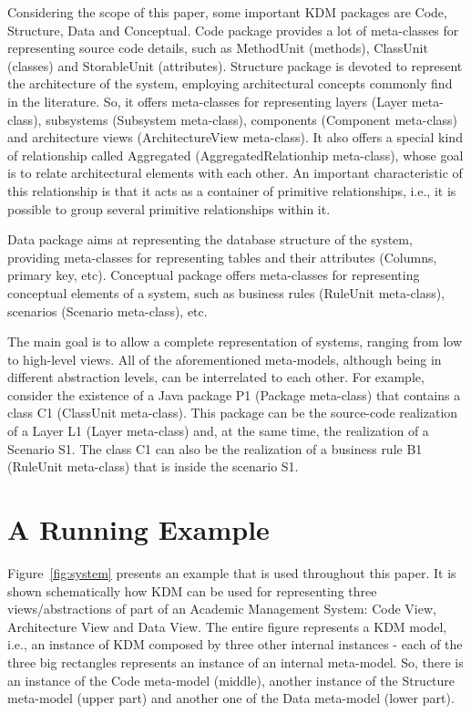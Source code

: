 Considering the scope of this paper, some important KDM packages are Code, Structure, Data and Conceptual. Code package provides a lot of meta-classes for representing source code details, such as MethodUnit (methods), ClassUnit (classes) and StorableUnit (attributes). Structure package is devoted to represent the architecture of the system, employing architectural concepts commonly find in the literature. So, it offers meta-classes for representing layers (Layer meta-class), subsystems (Subsystem meta-class), components (Component meta-class) and architecture views (ArchitectureView meta-class). It also offers a special kind of relationship called Aggregated (AggregatedRelationhip meta-class), whose goal is to relate architectural elements with each other. An important characteristic of this relationship is that it acts as a container of primitive relationships, i.e., it is possible to group several primitive relationships within it. 

Data package aims at representing the database structure of the system, providing meta-classes for representing tables and their attributes (Columns, primary key, etc). Conceptual package offers meta-classes for representing conceptual elements of a system, such as business rules (RuleUnit meta-class), scenarios (Scenario meta-class), etc. 

The main goal is to allow a complete representation of systems, ranging from low to high-level views. All of the aforementioned meta-models, although being in different abstraction levels, can be interrelated to each other. For example, consider the existence of a Java package P1 (Package meta-class) that contains a class C1 (ClassUnit meta-class). This package can be the source-code realization of a Layer L1 (Layer meta-class) and, at the same time, the realization of a Scenario S1. The class C1 can also be the realization of a business rule B1 (RuleUnit meta-class) that is inside the scenario S1. 

\section{A Running Example}\label{sec:running_example}

Figure~\ref{fig:system} presents an example that is used throughout this paper. It is shown schematically how KDM can be used for representing three views/abstractions of part of an Academic Management System: Code View, Architecture View and Data View. The entire figure represents a KDM model, i.e., an instance of KDM composed by three other internal instances - each of the three big rectangles represents an instance of an internal meta-model. So, there is an instance of the Code meta-model (middle), another instance of the Structure meta-model (upper part) and another one of the Data meta-model (lower part). 

